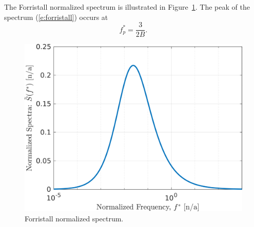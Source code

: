 \documentclass[utf8]{frontiersSCNS} %
\begin{document}
The Forristall normalized spectrum is illustrated in Figure~\ref{f:forristall_norm}.   The peak of the spectrum (\ref{e:forristall}) occurs at
\begin{equation}
f^*_p = \frac{3}{2B}.
\end{equation}
\begin{figure}[h!]
  \centering
  \includegraphics[width=\SFc\textwidth]{src/forristall_norm.png}
  \caption{Forristall normalized spectrum.}
  \label{f:forristall_norm}
\end{figure}
\end{document}
